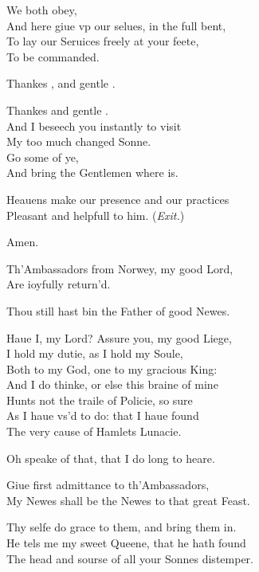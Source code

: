 \documentclass[a5paper,DIV=calc,11pt]{scrbook}
\begin{document}
\begin{drama*}
    \guilspeaks We both obey,\\
    And here giue vp our selues, in the full bent,\\
    To lay our Seruices freely at your feete,\\
    To be commanded.
    
    \kingspeaks Thankes \rosin, and gentle \guil.
    
    \queenspeaks Thankes \guil and gentle \rosin.\\
    And I beseech you instantly to visit\\
    My too much changed Sonne.\\
    Go some of ye,\\
    And bring the Gentlemen where \ham is.
    
    \guilspeaks Heauens make our presence and our practices\\
    Pleasant and helpfull to him. \hfill(\textit{Exit.})
    
    \queenspeaks Amen.
    
    
    \polspeaks Th'Ambassadors from Norwey, my good Lord,\\
    Are ioyfully return'd.
    
    \kingspeaks Thou still hast bin the Father of good Newes.
    
    \polspeaks Haue I, my Lord? Assure you, my good Liege,\\
    I hold my dutie, as I hold my Soule,\\
    Both to my God, one to my gracious King:\\
    And I do thinke, or else this braine of mine\\
    Hunts not the traile of Policie, so sure\\
    As I haue vs'd to do: that I haue found\\
    The very cause of Hamlets Lunacie.
    
    \kingspeaks Oh speake of that, that I do long to heare.
    
    \polspeaks Giue first admittance to th'Ambassadors,\\
    My Newes shall be the Newes to that great Feast.
    
    \kingspeaks Thy selfe do grace to them, and bring them in.\\
    He tels me my sweet Queene, that he hath found\\
    The head and sourse of all your Sonnes distemper.
    

\end{drama*}
\end{document}
